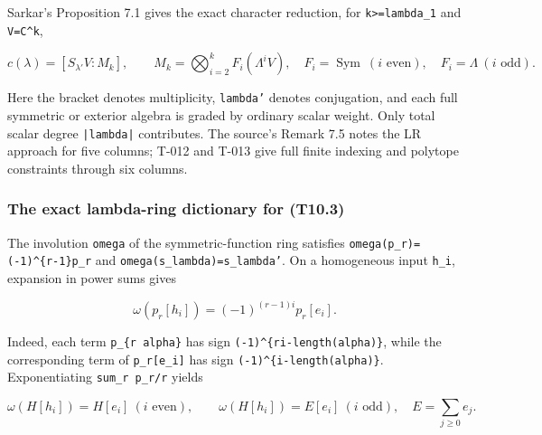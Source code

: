 \documentclass[
  10pt,
]{article}
\begin{document}
Sarkar's Proposition 7.1 gives the exact character reduction, for
\texttt{\small k>=\allowbreak{}lambda\_\allowbreak{}1} and
\texttt{\small V=\allowbreak{}C\textasciicircum{}k},

\[
c(\lambda)=[S_{\lambda'}V:M_k],\qquad
M_k=\bigotimes_{i=2}^k F_i(\Lambda^iV),
\quad F_i=\operatorname{Sym}\ (i\text{ even}),\quad
F_i=\Lambda\ (i\text{ odd}).
\tag{T10.3}
\]

Here the bracket denotes multiplicity, \texttt{\small lambda'} denotes
conjugation, and each full symmetric or exterior algebra is graded by
ordinary scalar weight. Only total scalar degree
\texttt{\small |lambda|} contributes. The source's Remark 7.5 notes the
LR approach for five columns; T-012 and T-013 give full finite indexing
and polytope constraints through six columns.

\subsubsection{The exact lambda-ring dictionary for
(T10.3)}\label{the-exact-lambda-ring-dictionary-for-t10.3}

The involution \texttt{\small omega} of the symmetric-function ring
satisfies
\texttt{\small omega(\allowbreak{}p\_\allowbreak{}r)\allowbreak{}=\allowbreak{}(\allowbreak{}-\allowbreak{}1)\allowbreak{}\textasciicircum{}\{r-\allowbreak{}1\}p\_\allowbreak{}r}
and
\texttt{\small omega(\allowbreak{}s\_\allowbreak{}lambda)\allowbreak{}=\allowbreak{}s\_\allowbreak{}lambda'}.
On a homogeneous input \texttt{\small h\_\allowbreak{}i}, expansion in
power sums gives

\[
\omega(p_r[h_i])=(-1)^{(r-1)i}p_r[e_i].
\]

Indeed, each term \texttt{\small p\_\allowbreak{}\{r alpha\}} has sign
\texttt{\small (\allowbreak{}-\allowbreak{}1)\allowbreak{}\textasciicircum{}\{ri-\allowbreak{}length(\allowbreak{}alpha)\allowbreak{}\}},
while the corresponding term of
\texttt{\small p\_\allowbreak{}r[\allowbreak{}e\_\allowbreak{}i]\allowbreak{}}
has sign
\texttt{\small (\allowbreak{}-\allowbreak{}1)\allowbreak{}\textasciicircum{}\{i-\allowbreak{}length(\allowbreak{}alpha)\allowbreak{}\}}.
Exponentiating
\texttt{\small sum\_\allowbreak{}r p\_\allowbreak{}r/\allowbreak{}r}
yields

\[
\omega(H[h_i])=H[e_i]\ (i\text{ even}),\qquad
\omega(H[h_i])=E[e_i]\ (i\text{ odd}),
\quad E=\sum_{j\ge0}e_j.
\tag{T10.4}
\]
\end{document}
